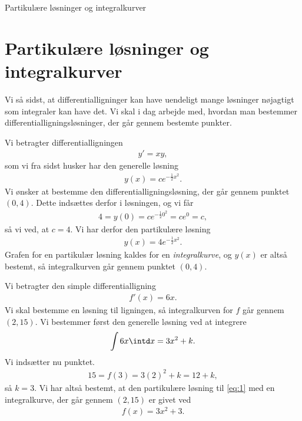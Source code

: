 \begin{center}
\Huge
Partikulære løsninger og integralkurver
\end{center}

\section*{Partikulære løsninger og integralkurver}

Vi så sidst, at differentialligninger kan have uendeligt mange løsninger nøjagtigt som integraler kan have det. Vi skal i dag arbejde med, hvordan man bestemmer differentialligningsløsninger, der går gennem bestemte punkter. 

\begin{exa}
	Vi betragter differentialligningen 
	\begin{align*}
		y' = xy,
	\end{align*}
	som vi fra sidst husker har den generelle løsning 
	\begin{align*}
		y(x) = ce^{-\frac{1}{2}x^2}.
	\end{align*}
	Vi ønsker at bestemme den differentialligningsløsning, der går gennem punktet $(0,4)$.
	Dette indsættes derfor i løsningen, og vi får
	\begin{align*}
		4=y(0) = ce^{-\frac{1}{2}0^2} = ce^0= c, 
	\end{align*}
	så vi ved, at $c=4$. Vi har derfor den partikulære løsning 
	\begin{align*}
		y(x) = 4e^{-\frac{1}{2}x^2}.
	\end{align*}
	Grafen for en partikulær løsning kaldes for en \textit{integralkurve}, og $y(x)$ er altså
	bestemt, så integralkurven går gennem punktet $(0,4)$. 
\end{exa}

\begin{exa}
	Vi betragter den simple differentialligning
	\begin{align}\label{eq:1}
		f'(x) = 6x.
	\end{align}
	Vi skal bestemme en løsning til ligningen, så integralkurven for $f$ går gennem $(2,15)$. 
	Vi bestemmer først den generelle løsning ved at integrere
	\begin{align*}
		\int 6x \intd x = 3x^2 + k.
	\end{align*}
	Vi indsætter nu punktet.
	\begin{align*}
		15=f(3) = 3(2)^2+k = 12+k,
	\end{align*}
	så $k=3$. 
	Vi har altså bestemt, at den partikulære løsning til \eqref{eq:1} med en integralkurve, 
	der går gennem $(2,15)$ er givet ved 
	\begin{align*}
		f(x) = 3x^2+3.
	\end{align*}
\end{exa}



